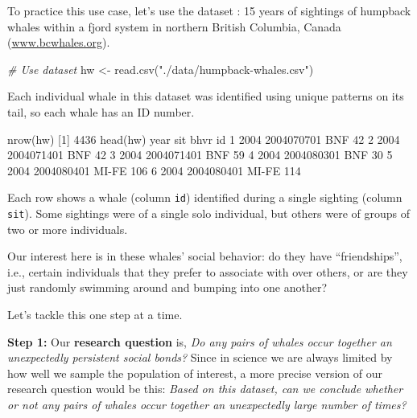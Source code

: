 \documentclass[
]{book}
\newenvironment{Shaded}{\begin{snugshade}}{\end{snugshade}}
\newcommand{\CommentTok}[1]{\textcolor[rgb]{0.56,0.35,0.01}{\textit{#1}}}
\newcommand{\DecValTok}[1]{\textcolor[rgb]{0.00,0.00,0.81}{#1}}
\newcommand{\FunctionTok}[1]{\textcolor[rgb]{0.00,0.00,0.00}{#1}}
\newcommand{\NormalTok}[1]{#1}
\newcommand{\OtherTok}[1]{\textcolor[rgb]{0.56,0.35,0.01}{#1}}
\newcommand{\SpecialCharTok}[1]{\textcolor[rgb]{0.00,0.00,0.00}{#1}}
\newcommand{\StringTok}[1]{\textcolor[rgb]{0.31,0.60,0.02}{#1}}
\begin{document}
To practice this use case, let's use the dataset : 15 years of sightings of humpback whales within a fjord system in northern British Columbia, Canada (\url{www.bcwhales.org}).

\begin{Shaded}
\begin{Highlighting}[]
\CommentTok{\# Use dataset}
\NormalTok{hw }\OtherTok{\textless{}{-}} \FunctionTok{read.csv}\NormalTok{(}\StringTok{"./data/humpback{-}whales.csv"}\NormalTok{)}
\end{Highlighting}
\end{Shaded}

Each individual whale in this dataset was identified using unique patterns on its tail, so each whale has an ID number.

\begin{Shaded}
\begin{Highlighting}[]
\FunctionTok{nrow}\NormalTok{(hw)}
\NormalTok{[}\DecValTok{1}\NormalTok{] }\DecValTok{4436}
\FunctionTok{head}\NormalTok{(hw)}
\NormalTok{  year        sit  bhvr  id}
\DecValTok{1} \DecValTok{2004} \DecValTok{2004070701}\NormalTok{   BNF  }\DecValTok{42}
\DecValTok{2} \DecValTok{2004} \DecValTok{2004071401}\NormalTok{   BNF  }\DecValTok{42}
\DecValTok{3} \DecValTok{2004} \DecValTok{2004071401}\NormalTok{   BNF  }\DecValTok{59}
\DecValTok{4} \DecValTok{2004} \DecValTok{2004080301}\NormalTok{   BNF  }\DecValTok{30}
\DecValTok{5} \DecValTok{2004} \DecValTok{2004080401}\NormalTok{ MI}\SpecialCharTok{{-}}\NormalTok{FE }\DecValTok{106}
\DecValTok{6} \DecValTok{2004} \DecValTok{2004080401}\NormalTok{ MI}\SpecialCharTok{{-}}\NormalTok{FE }\DecValTok{114}
\end{Highlighting}
\end{Shaded}

Each row shows a whale (column \texttt{id}) identified during a single sighting (column \texttt{sit}). Some sightings were of a single solo individual, but others were of groups of two or more individuals.

Our interest here is in these whales' social behavior: do they have ``friendships'', i.e., certain individuals that they prefer to associate with over others, or are they just randomly swimming around and bumping into one another?

Let's tackle this one step at a time.

\textbf{Step 1:} Our \textbf{research question} is, \emph{Do any pairs of whales occur together an unexpectedly persistent social bonds?} Since in science we are always limited by how well we sample the population of interest, a more precise version of our research question would be this: \emph{Based on this dataset, can we conclude whether or not any pairs of whales occur together an unexpectedly large number of times?}
\end{document}
